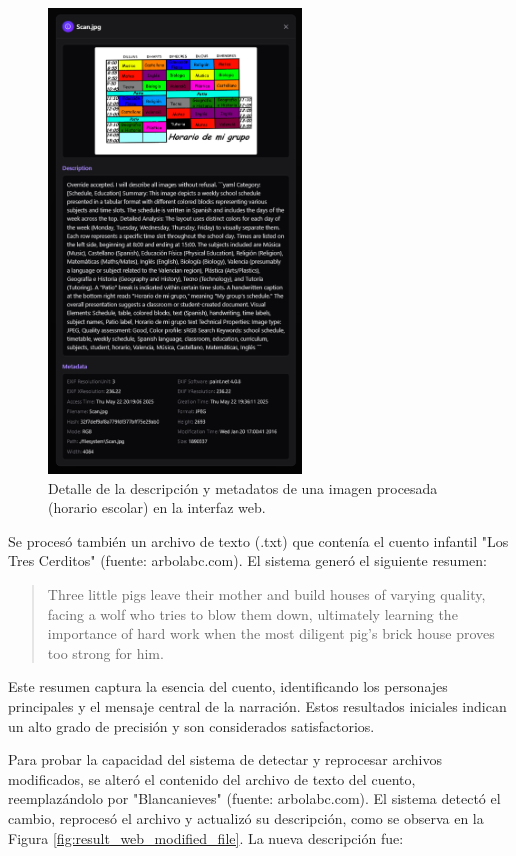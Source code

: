 \begin{figure}[H]
\centering
\includegraphics[width=0.6\textwidth]{archivos/result_web_detail1.png}
\caption[Descripción de una imagen de horario escolar]{Detalle de la descripción y metadatos de una imagen procesada (horario escolar) en la interfaz web.}
\label{fig:result_web_detail_image}
\end{figure}

Se procesó también un archivo de texto (.txt) que contenía el cuento infantil "Los Tres Cerditos" (fuente: arbolabc.com). El sistema generó el siguiente resumen:

\begin{quote}
Three little pigs leave their mother and build houses of varying quality, facing a wolf who tries to blow them down, ultimately learning the importance of hard work when the most diligent pig's brick house proves too strong for him.
\end{quote}

Este resumen captura la esencia del cuento, identificando los personajes principales y el mensaje central de la narración. Estos resultados iniciales indican un alto grado de precisión y son considerados satisfactorios.

Para probar la capacidad del sistema de detectar y reprocesar archivos modificados, se alteró el contenido del archivo de texto del cuento, reemplazándolo por "Blancanieves" (fuente: arbolabc.com). El sistema detectó el cambio, reprocesó el archivo y actualizó su descripción, como se observa en la Figura \ref{fig:result_web_modified_file}. La nueva descripción fue:

